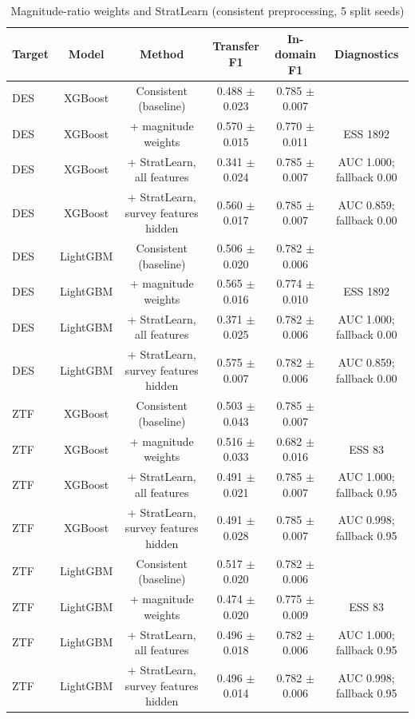 \begin{table}
\centering
\caption{Magnitude-ratio weights and StratLearn (consistent preprocessing, 5 split seeds)}
\begin{tabular}{lccccc}
\hline
Target & Model & Method & Transfer F1 & In-domain F1 & Diagnostics \\
\hline
DES & XGBoost & Consistent (baseline) & 0.488 $\pm$ 0.023 & 0.785 $\pm$ 0.007 &  \\
DES & XGBoost & + magnitude weights & 0.570 $\pm$ 0.015 & 0.770 $\pm$ 0.011 & ESS 1892 \\
DES & XGBoost & + StratLearn, all features & 0.341 $\pm$ 0.024 & 0.785 $\pm$ 0.007 & AUC 1.000; fallback 0.00 \\
DES & XGBoost & + StratLearn, survey features hidden & 0.560 $\pm$ 0.017 & 0.785 $\pm$ 0.007 & AUC 0.859; fallback 0.00 \\
DES & LightGBM & Consistent (baseline) & 0.506 $\pm$ 0.020 & 0.782 $\pm$ 0.006 &  \\
DES & LightGBM & + magnitude weights & 0.565 $\pm$ 0.016 & 0.774 $\pm$ 0.010 & ESS 1892 \\
DES & LightGBM & + StratLearn, all features & 0.371 $\pm$ 0.025 & 0.782 $\pm$ 0.006 & AUC 1.000; fallback 0.00 \\
DES & LightGBM & + StratLearn, survey features hidden & 0.575 $\pm$ 0.007 & 0.782 $\pm$ 0.006 & AUC 0.859; fallback 0.00 \\
ZTF & XGBoost & Consistent (baseline) & 0.503 $\pm$ 0.043 & 0.785 $\pm$ 0.007 &  \\
ZTF & XGBoost & + magnitude weights & 0.516 $\pm$ 0.033 & 0.682 $\pm$ 0.016 & ESS 83 \\
ZTF & XGBoost & + StratLearn, all features & 0.491 $\pm$ 0.021 & 0.785 $\pm$ 0.007 & AUC 1.000; fallback 0.95 \\
ZTF & XGBoost & + StratLearn, survey features hidden & 0.491 $\pm$ 0.028 & 0.785 $\pm$ 0.007 & AUC 0.998; fallback 0.95 \\
ZTF & LightGBM & Consistent (baseline) & 0.517 $\pm$ 0.020 & 0.782 $\pm$ 0.006 &  \\
ZTF & LightGBM & + magnitude weights & 0.474 $\pm$ 0.020 & 0.775 $\pm$ 0.009 & ESS 83 \\
ZTF & LightGBM & + StratLearn, all features & 0.496 $\pm$ 0.018 & 0.782 $\pm$ 0.006 & AUC 1.000; fallback 0.95 \\
ZTF & LightGBM & + StratLearn, survey features hidden & 0.496 $\pm$ 0.014 & 0.782 $\pm$ 0.006 & AUC 0.998; fallback 0.95 \\
\hline
\end{tabular}
\end{table}
